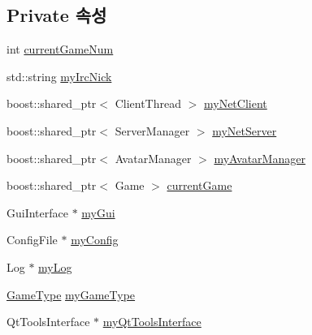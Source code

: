 \subsection*{Private 속성}
\begin{DoxyCompactItemize}
\item 
int \hyperlink{class_session_a89974964b38a285de9ec954b99b0ee3f}{current\-Game\-Num}
\item 
std\-::string \hyperlink{class_session_a95063949539c8584d569d777284784ba}{my\-Irc\-Nick}
\item 
boost\-::shared\-\_\-ptr$<$ Client\-Thread $>$ \hyperlink{class_session_a767e3250d6a14be4c2b86d1e2dfa7b3c}{my\-Net\-Client}
\item 
boost\-::shared\-\_\-ptr$<$ Server\-Manager $>$ \hyperlink{class_session_a0f513f8d52d5026a3c449738da984c29}{my\-Net\-Server}
\item 
boost\-::shared\-\_\-ptr$<$ Avatar\-Manager $>$ \hyperlink{class_session_a53231528d2b4c4babd97c7d1194a5f7e}{my\-Avatar\-Manager}
\item 
boost\-::shared\-\_\-ptr$<$ Game $>$ \hyperlink{class_session_a5c15d5f1be74a30fa167a0af5822113c}{current\-Game}
\item 
Gui\-Interface $\ast$ \hyperlink{class_session_a2725f4b56b109b2e7d75ed780d24fa6d}{my\-Gui}
\item 
Config\-File $\ast$ \hyperlink{class_session_a5bfbe43c623b688e7def57e02704033f}{my\-Config}
\item 
Log $\ast$ \hyperlink{class_session_a1d2dd8533f3c551a5c18211f22d380f8}{my\-Log}
\item 
\hyperlink{class_session_a6989c72d21ad19fd7abbd1c8d95d78c1}{Game\-Type} \hyperlink{class_session_acf11b7b3982bc3e4c5bbf635d5e98496}{my\-Game\-Type}
\item 
Qt\-Tools\-Interface $\ast$ \hyperlink{class_session_a1827a0341223eafa3859f249e73ebd38}{my\-Qt\-Tools\-Interface}
\end{DoxyCompactItemize}


